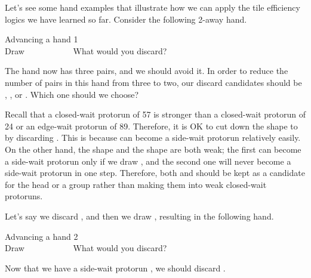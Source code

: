 Let's see some hand examples that illustrate how we can apply the tile efficiency logics we have learned so far. Consider the following 2-away hand. 
\begin{itembox}[r]{Advancing a hand 1}
\bp
{}~\\
\hfill\footnotesize{Draw~~~~~~~~~~~}
\ep
\vspace{-17pt}What would you discard? \vspace{-5pt}
\end{itembox}
\noindent
The hand now has three pairs, and we should avoid it. In order to reduce the number of pairs in this hand from three to two, our discard candidates should be {\LARGE{}}, {\LARGE{}}, or {\LARGE{}}. Which one should we choose? 

\bigskip
Recall that a closed-wait protorun of 57 is stronger than a closed-wait protorun of 24 or an edge-wait protorun of 89. Therefore, it is OK to cut down the {\LARGE{}} shape to {\LARGE{}} by discarding {\LARGE{}}. This is because {\LARGE{}} can become a side-wait protorun relatively easily. On the other hand, the {\LARGE{}} shape and the {\LARGE{}} shape are both weak; the first can become a side-wait protorun only if we draw {\LARGE{}}, and the second one will never become a side-wait protorun in one step. Therefore, both {\LARGE{}} and {\LARGE{}} should be kept as a candidate for the head or a group rather than making them into weak closed-wait protoruns.

\bigskip
Let's say we discard {\LARGE{}}, and then we draw {\LARGE{}}, resulting in the following hand. 
\begin{itembox}[r]{Advancing a hand 2}
\bp
{}~\\
\hfill\footnotesize{Draw~~~~~~~~~~~}
\ep
\vspace{-17pt}What would you discard? \vspace{-5pt}
\end{itembox}
\noindent
Now that we have a side-wait protorun {\LARGE{}}, we should discard {\LARGE{}}. 

